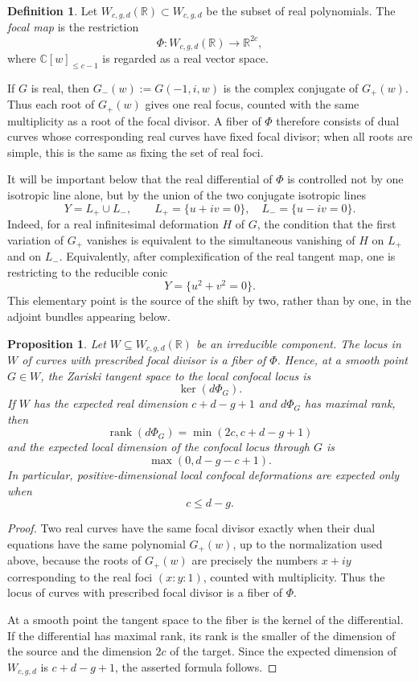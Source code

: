 \documentclass[11pt]{amsart}
\newtheorem{prop}[lemma]{Proposition}
\theoremstyle{definition}
\newtheorem{definition}[lemma]{Definition}
\theoremstyle{remark}
\newcommand{\bR}{\mathbb{R}}
\begin{document}
\begin{definition}
Let $W_{c,g,d}(\bR)\subset W_{c,g,d}$ be the subset of real polynomials. The \emph{focal map} is the restriction
\[
\Phi\colon W_{c,g,d}(\bR)\to \bR^{2c},
\]
where $\mathbb C[w]_{\le c-1}$ is regarded as a real vector space.
\end{definition}
If $G$ is real, then $G_-(w):=G(-1,i,w)$ is the complex conjugate of $G_+(w)$. Thus each root of $G_+(w)$ gives one real focus, counted with the same multiplicity as a root of the focal divisor.  A fiber of $\Phi$ therefore consists of dual curves whose corresponding real curves have fixed focal divisor; when all roots are simple, this is the same as fixing the set of real foci.

It will be important below that the real differential of $\Phi$ is controlled not by one isotropic line alone, but by the union of the two conjugate isotropic lines
\[
Y=L_+\cup L_-,\qquad L_+=\{u+iv=0\},\quad L_- =\{u-iv=0\}.
\]
Indeed, for a real infinitesimal deformation $H$ of $G$, the condition that the first variation of $G_+$ vanishes is equivalent to the simultaneous vanishing of $H$ on $L_+$ and on $L_-$. Equivalently, after complexification of the real tangent map, one is restricting to the reducible conic
\[
Y=\{u^2+v^2=0\}.
\]
This elementary point is the source of the shift by two, rather than by one, in the adjoint bundles appearing below.

\begin{prop}\label{prop:focal-fibers}
Let $W\subseteq W_{c,g,d}(\bR)$ be an irreducible component. The locus in $W$ of curves with prescribed focal divisor is a fiber of $\Phi$. Hence, at a smooth point $G\in W$, the Zariski tangent space to the local confocal locus is
\[
\ker(d\Phi_G).
\]
If $W$ has the expected real dimension $c+d-g+1$ and $d\Phi_G$ has maximal rank, then
\[
\operatorname{rank}(d\Phi_G)=\min(2c,c+d-g+1)
\]
and the expected local dimension of the confocal locus through $G$ is
\[
\max(0,d-g-c+1).
\]
In particular, positive-dimensional local confocal deformations are expected only when
\[
c\le d-g.
\]
\end{prop}

\begin{proof}
Two real curves have the same focal divisor exactly when their dual equations have the same polynomial $G_+(w)$, up to the normalization used above, because the roots of $G_+(w)$ are precisely the numbers $x+iy$ corresponding to the real foci $(x:y:1)$, counted with multiplicity. Thus the locus of curves with prescribed focal divisor is a fiber of $\Phi$.

At a smooth point the tangent space to the fiber is the kernel of the differential. If the differential has maximal rank, its rank is the smaller of the dimension of the source and the dimension $2c$ of the target. Since the expected dimension of $W_{c,g,d}$ is $c+d-g+1$, the asserted formula follows.
\end{proof}
\end{document}
